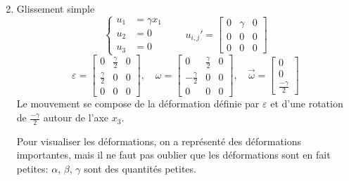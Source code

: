 \begin{enumerate}
\begin{equation}
            \label{eq:Ch03-043}
        \end{equation}
    \item Glissement simple
        \begin{equation}
            \left\{
            \begin{aligned}
                u_1 &= \gamma x_1 \\
                u_2 &= 0 \\
                u_3 &= 0
            \end{aligned}
            \right. \qquad
            u_{i,j}' = 
            \begin{bmatrix}
                0 & \gamma & 0 \\
                0 & 0 & 0 \\
                0 & 0 & 0
            \end{bmatrix}
            \label{eq:Ch03-044}
        \end{equation}
        \begin{equation}
            \mathbb{\varepsilon} = 
            \begin{bmatrix}
                0 & \frac{\gamma}{2} & 0 \\
                \frac{\gamma}{2} & 0 & 0 \\
                0 & 0 & 0
            \end{bmatrix}, \quad
            \mathbb{\omega} = 
            \begin{bmatrix}
                0 & \frac{\gamma}{2} & 0 \\
                -\frac{\gamma}{2} & 0 & 0 \\
                0 & 0 & 0
            \end{bmatrix}, \quad
            \vec{\omega} = 
            \begin{bmatrix}
                0 \\
                0 \\
                \frac{-\gamma}{2}
            \end{bmatrix}
            \label{eq:Ch03-045}
        \end{equation}
        Le mouvement se compose de la déformation définie par $\varepsilon$ et d'une rotation de $\frac{-\gamma}{2}$ autour de l'axe $x_3$.

        Pour visualiser les déformations, on a représenté des déformations importantes, mais il ne faut pas oublier que les déformations sont en fait petites: $\alpha$, $\beta$, $\gamma$ sont des quantités petites.
\end{enumerate}
